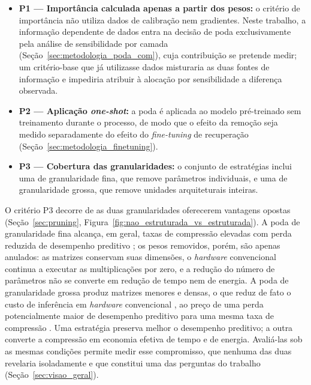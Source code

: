 \begin{itemize}
    \item \textbf{P1 --- Importância calculada apenas a partir dos pesos:} o critério de
          importância não utiliza dados de calibração nem gradientes. Neste trabalho, a
          informação dependente de dados entra na decisão de poda exclusivamente pela
          análise de sensibilidade por camada (Seção~\ref{sec:metodologia_poda_com}), cuja
          contribuição se pretende medir; um critério-base que já utilizasse dados
          misturaria as duas fontes de informação e impediria atribuir à alocação por
          sensibilidade a diferença observada.
    \item \textbf{P2 --- Aplicação \textit{one-shot}:} a poda é aplicada ao modelo
          pré-treinado sem treinamento durante o processo, de modo que o efeito da remoção
          seja medido separadamente do efeito do \textit{fine-tuning} de recuperação
          (Seção~\ref{sec:metodologia_finetuning}).
    \item \textbf{P3 --- Cobertura das granularidades:} o conjunto de estratégias inclui
          uma de granularidade fina, que remove parâmetros individuais, e uma de
          granularidade grossa, que remove unidades arquiteturais inteiras.
\end{itemize}

O critério P3 decorre de as duas granularidades oferecerem vantagens opostas
(Seção~\ref{sec:pruning}, Figura~\ref{fig:nao_estruturada_vs_estruturada}). A poda de
granularidade fina alcança, em geral, taxas de compressão elevadas com perda reduzida de
desempenho preditivo \cite{Blalock2020}; os pesos removidos, porém, são apenas anulados:
as matrizes conservam suas dimensões, o \textit{hardware} convencional continua a executar
as multiplicações por zero, e a redução do número de parâmetros não se converte em redução
de tempo nem de energia. A poda de granularidade grossa produz matrizes menores e densas,
o que reduz de fato o custo de inferência em \textit{hardware} convencional \cite{Li2017},
ao preço de uma perda potencialmente maior de desempenho preditivo para uma mesma taxa de
compressão \cite{Blalock2020}. Uma estratégia preserva melhor o desempenho preditivo; a
outra converte a compressão em economia efetiva de tempo e de energia. Avaliá-las sob as
mesmas condições permite medir esse compromisso, que nenhuma das duas revelaria
isoladamente e que constitui uma das perguntas do trabalho
(Seção~\ref{sec:visao_geral}).

